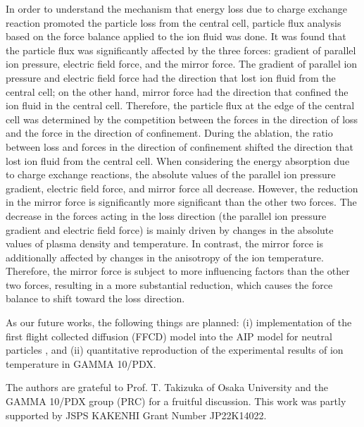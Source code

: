 \documentclass{jasse}%
\begin{document}
In order to understand the mechanism that energy loss due to charge exchange reaction promoted the particle loss from the central cell, particle flux analysis based on the force balance applied to the ion fluid was done. It was found that the particle flux was significantly affected by the three forces: gradient of parallel ion pressure, electric field force, and the mirror force. The gradient of parallel ion pressure and electric field force had the direction that lost ion fluid from the central cell; on the other hand, mirror force had the direction that confined the ion fluid in the central cell. Therefore, the particle flux at the edge of the central cell was determined by the competition between the forces in the direction of loss and the force in the direction of confinement. During the ablation, the ratio between loss and forces in the direction of confinement shifted the direction that lost ion fluid from the central cell. When considering the energy absorption due to charge exchange reactions, the absolute values of the parallel ion pressure gradient, electric field force, and mirror force all decrease. However, the reduction in the mirror force is significantly more significant than the other two forces. The decrease in the forces acting in the loss direction (the parallel ion pressure gradient and electric field force) is mainly driven by changes in the absolute values of plasma density and temperature. In contrast, the mirror force is additionally affected by changes in the anisotropy of the ion temperature. Therefore, the mirror force is subject to more influencing factors than the other two forces, resulting in a more substantial reduction, which causes the force balance to shift toward the loss direction.

As our future works, the following things are planned: (i) implementation of the first flight collected diffusion (FFCD) model into the AIP model for neutral particles \cite{prinja92}, and (ii) quantitative reproduction of the experimental results of ion temperature in GAMMA 10/PDX.

\acknowledgement
The authors are grateful to Prof. T. Takizuka of Osaka University and the GAMMA 10/PDX group (PRC) for a fruitful discussion. This work was partly supported by JSPS KAKENHI Grant Number JP22K14022.
\end{document}
